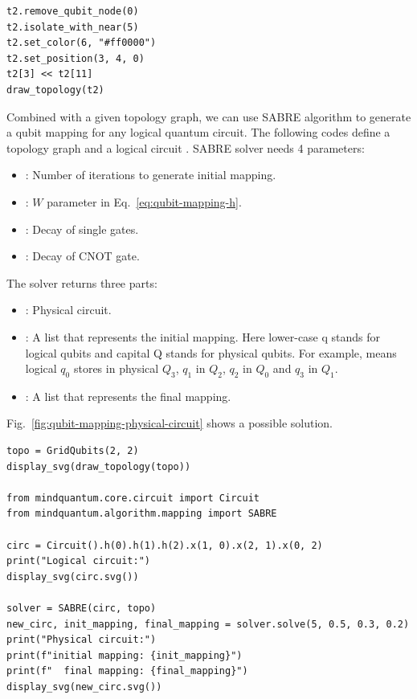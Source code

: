 \begin{lstlisting}
t2.remove_qubit_node(0)
t2.isolate_with_near(5)
t2.set_color(6, "#ff0000")
t2.set_position(3, 4, 0)
t2[3] << t2[11]
draw_topology(t2)
\end{lstlisting}

Combined with a given topology graph, we can use SABRE algorithm to generate a qubit mapping for any logical quantum circuit. The following codes define a topology graph  and a logical circuit . SABRE solver needs 4 parameters:
\begin{itemize}
	\item {}: Number of iterations to generate initial mapping.
	\item {}: $W$ parameter in Eq.~\eqref{eq:qubit-mapping-h}.
	\item {}: Decay of single gates.
	\item {}: Decay of CNOT gate.
\end{itemize}
The solver returns three parts:
\begin{itemize}
	\item {}: Physical circuit.
	\item {}: A list that represents the initial mapping. Here lower-case q stands for logical qubits and capital Q stands for physical qubits. For example, \code{[3, 2, 0, 1]} means logical $q_0$ stores in physical $Q_3$, $q_1$ in $Q_2$, $q_2$ in $Q_0$ and $q_3$ in $Q_1$.
	\item {}: A list that represents the final mapping.
\end{itemize}
Fig.~\ref{fig:qubit-mapping-physical-circuit} shows a possible solution.

\begin{lstlisting}
topo = GridQubits(2, 2)
display_svg(draw_topology(topo))

from mindquantum.core.circuit import Circuit
from mindquantum.algorithm.mapping import SABRE

circ = Circuit().h(0).h(1).h(2).x(1, 0).x(2, 1).x(0, 2)
print("Logical circuit:")
display_svg(circ.svg())

solver = SABRE(circ, topo)
new_circ, init_mapping, final_mapping = solver.solve(5, 0.5, 0.3, 0.2)
print("Physical circuit:")
print(f"initial mapping: {init_mapping}")
print(f"  final mapping: {final_mapping}")
display_svg(new_circ.svg())
\end{lstlisting}

